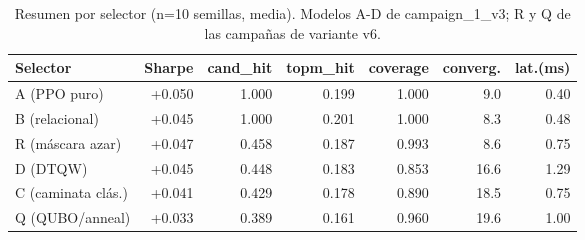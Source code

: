 \begin{table}[H]
\centering
\small
\caption{Resumen por selector (n=10 semillas, media). Modelos A-D de campaign\_1\_v3; R y Q de las campañas de variante v6.}
\label{tab:tabla_selectores}
\begin{tabular}{lrrrrrr}
\toprule
Selector & Sharpe & cand\_hit & topm\_hit & coverage & converg. & lat.(ms) \\
\midrule
A (PPO puro) & +0.050 & 1.000 & 0.199 & 1.000 & 9.0 & 0.40 \\
B (relacional) & +0.045 & 1.000 & 0.201 & 1.000 & 8.3 & 0.48 \\
R (máscara azar) & +0.047 & 0.458 & 0.187 & 0.993 & 8.6 & 0.75 \\
D (DTQW) & +0.045 & 0.448 & 0.183 & 0.853 & 16.6 & 1.29 \\
C (caminata clás.) & +0.041 & 0.429 & 0.178 & 0.890 & 18.5 & 0.75 \\
Q (QUBO/anneal) & +0.033 & 0.389 & 0.161 & 0.960 & 19.6 & 1.00 \\
\bottomrule
\end{tabular}
\end{table}

